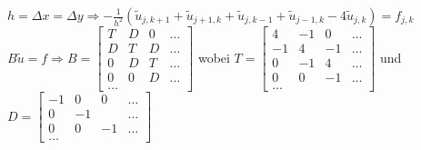 $h=\Delta x = \Delta y \Rightarrow \boxed{-\frac 1 {h^2} (\tilde{u}_{j,k+1} +
\tilde{u}_{j+1,k} + \tilde{u}_{j,k-1} + \tilde{u}_{j-1,k} - 4 \tilde{u}_{j,k})
= f_{j, k}}$\\[0.4cm]


$B \tilde{u} = f \Rightarrow B= \begin{bmatrix}
             T& D & 0 & \ldots \\
             D& T & D & \ldots \\
              0& D & T & \ldots \\
              0& 0 & D & \ldots \\
             \ldots 
           \end{bmatrix}$
wobei $T=\begin{bmatrix}
             4& -1 & 0 & \ldots \\
             -1& 4 & -1 & \ldots \\
              0& -1 & 4 & \ldots \\
              0& 0 & -1 & \ldots \\
             \ldots 
           \end{bmatrix}$
und $D=\begin{bmatrix}
             -1& 0& 0 & \ldots \\
             0 & -1 &  & \ldots \\
              0& 0&-1 & \ldots \\
             \ldots 
           \end{bmatrix}$

           
